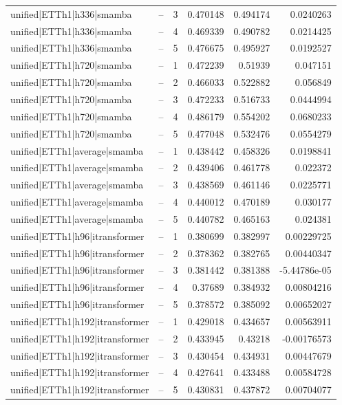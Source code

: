 \begin{longtable}{llrrrr}
unified|ETTh1|h336|smamba & -- & 3 & 0.470148 & 0.494174 & 0.0240263 \\
unified|ETTh1|h336|smamba & -- & 4 & 0.469339 & 0.490782 & 0.0214425 \\
unified|ETTh1|h336|smamba & -- & 5 & 0.476675 & 0.495927 & 0.0192527 \\
unified|ETTh1|h720|smamba & -- & 1 & 0.472239 & 0.51939 & 0.047151 \\
unified|ETTh1|h720|smamba & -- & 2 & 0.466033 & 0.522882 & 0.056849 \\
unified|ETTh1|h720|smamba & -- & 3 & 0.472233 & 0.516733 & 0.0444994 \\
unified|ETTh1|h720|smamba & -- & 4 & 0.486179 & 0.554202 & 0.0680233 \\
unified|ETTh1|h720|smamba & -- & 5 & 0.477048 & 0.532476 & 0.0554279 \\
unified|ETTh1|average|smamba & -- & 1 & 0.438442 & 0.458326 & 0.0198841 \\
unified|ETTh1|average|smamba & -- & 2 & 0.439406 & 0.461778 & 0.022372 \\
unified|ETTh1|average|smamba & -- & 3 & 0.438569 & 0.461146 & 0.0225771 \\
unified|ETTh1|average|smamba & -- & 4 & 0.440012 & 0.470189 & 0.030177 \\
unified|ETTh1|average|smamba & -- & 5 & 0.440782 & 0.465163 & 0.024381 \\
unified|ETTh1|h96|itransformer & -- & 1 & 0.380699 & 0.382997 & 0.00229725 \\
unified|ETTh1|h96|itransformer & -- & 2 & 0.378362 & 0.382765 & 0.00440347 \\
unified|ETTh1|h96|itransformer & -- & 3 & 0.381442 & 0.381388 & -5.44786e-05 \\
unified|ETTh1|h96|itransformer & -- & 4 & 0.37689 & 0.384932 & 0.00804216 \\
unified|ETTh1|h96|itransformer & -- & 5 & 0.378572 & 0.385092 & 0.00652027 \\
unified|ETTh1|h192|itransformer & -- & 1 & 0.429018 & 0.434657 & 0.00563911 \\
unified|ETTh1|h192|itransformer & -- & 2 & 0.433945 & 0.43218 & -0.00176573 \\
unified|ETTh1|h192|itransformer & -- & 3 & 0.430454 & 0.434931 & 0.00447679 \\
unified|ETTh1|h192|itransformer & -- & 4 & 0.427641 & 0.433488 & 0.00584728 \\
unified|ETTh1|h192|itransformer & -- & 5 & 0.430831 & 0.437872 & 0.00704077 \\

\end{longtable}
